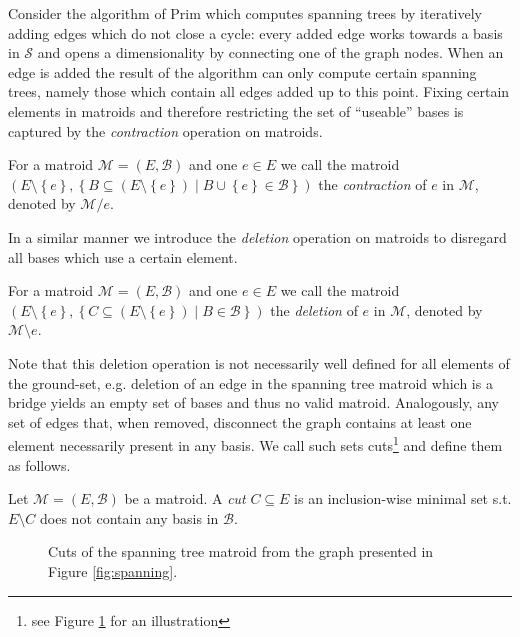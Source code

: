 \documentclass{scrartcl}
\theoremstyle{nonumberplain}
\newcommand{\tupel}[1]{\left(#1\right)}
\newcommand{\set}[1]{\left\{#1\right\}}
\begin{document}
Consider the algorithm of Prim which computes spanning trees by iteratively
adding edges which do not close a cycle: every added edge works towards a basis
in $\mathcal{S}$ and opens a dimensionality by connecting one of the graph
nodes. When an edge is added the result of the algorithm can only compute
certain spanning trees, namely those which contain all edges added up to this
point. Fixing certain elements in matroids and therefore restricting the set of
\enquote{useable} bases is captured by the \emph{contraction} operation on
matroids.
\begin{defi}
  For a matroid $\mathcal{M} = \tupel{E, \mathcal{B}}$ and one $e\in E$ we call
  the matroid $\tupel{E\setminus\set{e}, \set{B\subseteq
  (E\setminus\set{e})\middle| B\cup\set{e}\in\mathcal{B}}}$ the
  \emph{contraction} of $e$ in $\mathcal{M}$, denoted by $\mathcal{M}/e$.
\end{defi}
In a similar manner we introduce the \emph{deletion} operation on matroids to
disregard all bases which use a certain element.
\begin{defi}
  For a matroid $\mathcal{M} = \tupel{E, \mathcal{B}}$ and one $e\in E$ we call
  the matroid $\tupel{E\setminus\set{e}, \set{C\subseteq
  (E\setminus\set{e})\middle| B\in\mathcal{B}}}$ the \emph{deletion} of $e$ in
  $\mathcal{M}$, denoted by $\mathcal{M}\setminus e$.
\end{defi}
Note that this deletion operation is not necessarily well defined for all
elements of the ground-set, e.g. deletion of an edge in the spanning tree
matroid which is a bridge yields an empty set of bases and thus no valid
matroid. Analogously, any set of edges that, when removed, disconnect the graph
contains at least one element necessarily present in any basis. We call such
sets cuts\footnote{see Figure \ref{fig:cuts} for an illustration} and define
them as follows.
\begin{defi}
  Let $\mathcal{M} = \tupel{E, \mathcal{B}}$ be a matroid. A \emph{cut}
  $C\subseteq E$ is an inclusion-wise minimal set s.t. $E\setminus C$ does not
  contain any basis in $\mathcal{B}$.
\end{defi}
\begin{figure}
  \begin{center}
  \end{center}
  \caption{Cuts of the spanning tree matroid from the graph presented in Figure
    \ref{fig:spanning}.}
  \label{fig:cuts}
\end{figure}
\end{document}
